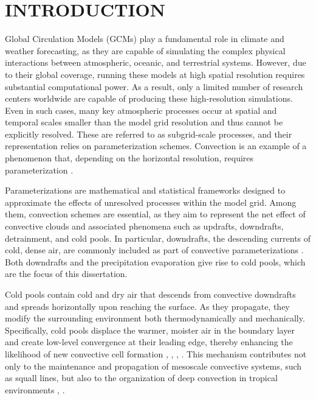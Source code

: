 
\chapter{INTRODUCTION}

Global Circulation Models (GCMs) play a fundamental role in climate and weather forecasting, as they are capable of simulating the complex physical interactions between atmospheric, oceanic, and terrestrial systems. However, due to their global coverage, running these models at high spatial resolution requires substantial computational power. As a result, only a limited number of research centers worldwide are capable of producing these high-resolution simulations. Even in such cases, many key atmospheric processes occur at spatial and temporal scales smaller than the model grid resolution and thus cannot be explicitly resolved. These are referred to as subgrid-scale processes, and their representation relies on parameterization schemes. Convection is an example of a phenomenon that, depending on the horizontal resolution, requires parameterization \cite{ arakawa1974interaction, arakawa2004cumulus, stensrud2007parameterization, arakawa2011toward}.

Parameterizations are mathematical and statistical frameworks designed to approximate the effects of unresolved processes within the model grid. Among them, convection schemes are essential, as they aim to represent the net effect of convective clouds and associated phenomena such as updrafts, downdrafts, detrainment, and cold pools. In particular, downdrafts, the descending currents of cold, dense air, are commonly included as part of convective parameterizations \cite{arakawa1974interaction, grell2014scale}. Both downdrafts and the precipitation evaporation give rise to cold pools, which are the focus of this dissertation.

Cold pools contain cold and dry air that descends from convective downdrafts and spreads horizontally upon reaching the surface. As they propagate, they modify the surrounding environment both thermodynamically and mechanically. Specifically, cold pools displace the warmer, moister air in the boundary layer and create low-level convergence at their leading edge, thereby enhancing the likelihood of new convective cell formation \cite{tompkins2001organization}, \cite{torri2015mechanisms}, \cite{feng2015mechanisms}, \cite{freitas2024parameterization}. This mechanism contributes not only to the maintenance and propagation of mesoscale convective systems, such as squall lines, but also to the organization of deep convection in tropical environments \cite{feng2015mechanisms}, \cite{freitas2024parameterization}.

